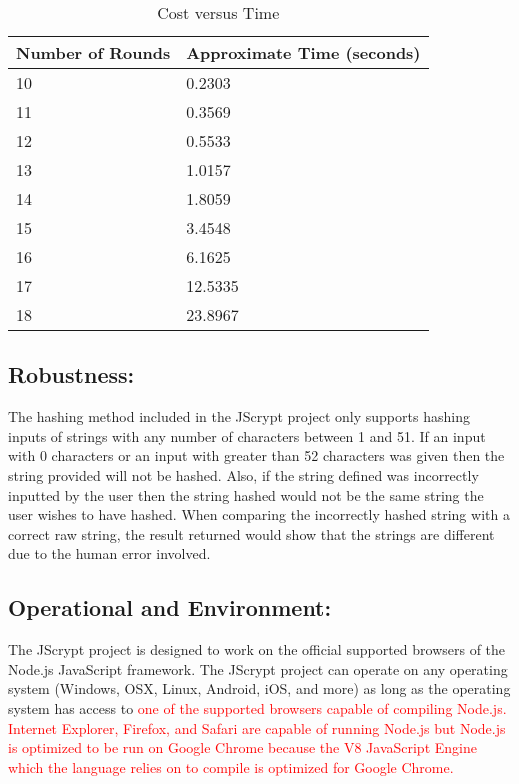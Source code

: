 \documentclass[12pt]{article}
\begin{document}
\begin{table}[H]
\centering
      \caption{Cost versus Time}
        \label{tab:table4}
      \begin{tabular}{ | p{4cm} | p{4cm} | }
        \hline
            \textbf{Number of Rounds} & \textbf{Approximate Time (seconds)} \\
        \hline
          10 & 0.2303 \\
       \hline
          11 & 0.3569 \\
       \hline
          12 & 0.5533 \\
       \hline
          13 & 1.0157 \\
       \hline
          14 & 1.8059 \\
       \hline
          15 & 3.4548 \\
       \hline
          16 & 6.1625 \\
       \hline
          17 & 12.5335 \\
       \hline
          18 & 23.8967 \\
       \hline
      \end{tabular}
  \end{table}

\subsection{Robustness:}
The hashing method included in the JScrypt project only supports hashing inputs of strings with any number of characters between 1 and 51. If an input with 0 characters or an input with greater than 52 characters was given then the string provided will not be hashed. Also, if the string defined was incorrectly inputted by the user then the string hashed would not be the same string the user wishes to have hashed. When comparing the incorrectly hashed string with a correct raw string, the result returned would show that the strings are different due to the human error involved.

\subsection{Operational and Environment:}
The JScrypt project is designed to work on the official supported browsers of the Node.js JavaScript framework. The JScrypt project can operate on any operating system (Windows, OSX, Linux, Android, iOS, and more) as long as the operating system has access to \textcolor{red}{one of the supported browsers capable of compiling Node.js. Internet Explorer, Firefox, and Safari are capable of running Node.js but Node.js is optimized to be run on Google Chrome because the V8 JavaScript Engine which the language relies on to compile is optimized for Google Chrome.}
\end{document}
